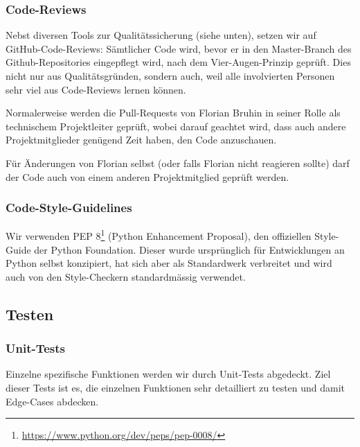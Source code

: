 \documentclass[a4paper]{article}
\begin{document}
\subsubsection{Code-Reviews}
\label{sec:codereviews}

Nebst diversen Tools zur Qualitätssicherung (siehe unten), setzen wir auf GitHub-Code-Reviews: Sämtlicher Code wird, bevor er in den Master-Branch des
Github-Repositories eingepflegt wird, nach dem Vier-Augen-Prinzip geprüft. Dies
nicht nur aus Qualitätsgründen, sondern auch, weil alle involvierten Personen
sehr viel aus Code-Reviews lernen können.

Normalerweise werden die Pull-Requests von Florian Bruhin in seiner Rolle als
technischem Projektleiter geprüft, wobei darauf geachtet wird, dass auch andere
Projektmitglieder genügend Zeit haben, den Code anzuschauen.

Für Änderungen von Florian selbst (oder falls Florian nicht reagieren sollte)
darf der Code auch von einem anderen Projektmitglied geprüft werden.

\subsubsection{Code-Style-Guidelines}
Wir verwenden PEP 8\footnote{\url{https://www.python.org/dev/peps/pep-0008/}}
(Python Enhancement Proposal), den offiziellen Style-Guide der Python
Foundation. Dieser wurde ursprünglich für Entwicklungen an Python selbst
konzipiert, hat sich aber als Standardwerk verbreitet und wird auch von den
Style-Checkern standardmässig verwendet.

\subsection{Testen}

\subsubsection{Unit-Tests}

Einzelne spezifische Funktionen werden wir durch Unit-Tests abgedeckt.
Ziel dieser Tests ist es, die einzelnen Funktionen sehr detailliert zu testen und damit Edge-Cases abdecken.
\end{document}
